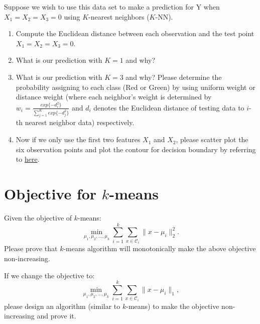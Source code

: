\documentclass[11pt]{article}
\newcommand{\R}{\mathbb{R}}
\newcommand{\mtx}[1]{\mathbf{#1}}
\newcommand{\vct}[1]{\mathbf{#1}}
\def \mA {\mtx{A}}
\def \mZ {\mtx{Z}}
\def \vx {\vct{x}}
\def \vy {\vct{y}}
\def \R {\mathbb{R}}
\begin{document}
\noindent Suppose we wish to use this data set to make a prediction for Y when $X_1=X_2=X_3=0$ using $K$-nearest neighbors ($K$-NN).
\begin{enumerate}
	\item Compute the Euclidean distance between each observation and the test point $X_1=X_2=X_3=0$.
	\item What is our prediction with $K=1$ and why? 
	\item What is our prediction with $K=3$ and why? Please determine the probability assigning to each class (Red or Green) by using uniform weight or distance weight (where each neighbor's weight is determined by $w_i=\frac{exp\{-d_i^2\}}{\sum_{j=1}^{K}exp\{-d_j^2\}}$ and $d_i$ denotes the Euclidean distance of testing data to $i$-th nearest neighbor data) respectively.
	\item Now if we only use the first two features $X_1$ and $X_2$, please scatter plot the six observation points and plot the contour for decision boundary by referring to \href{https://stackoverflow.com/questions/45075638/graph-k-nn-decision-boundaries-in-matplotlib}{here}.
\end{enumerate} 



\newpage
 \section*{Objective for $k$-means}
 Given the objective of $k$-means:
 \begin{equation}
 	\min\limits_{\mu_1,\mu_2,\dots,\mu_k}\sum_{i=1}^k\sum_{x\in\mathcal{C}_i}\|x-\mu_i\|^2_2.
 \end{equation}
Please prove that $k$-means algorithm will monotonically make the above objective non-increasing.


\vspace{.2cm}
\noindent If we change the objective to:
 \begin{equation}
	\min\limits_{\mu_1,\mu_2,\dots,\mu_k}\sum_{i=1}^k\sum_{x\in\mathcal{C}_i}\|x-\mu_i\|_1,
\end{equation}
please design an algorithm (similar to $k$-means) to make the objective non-increasing and prove it. 
\end{document}
